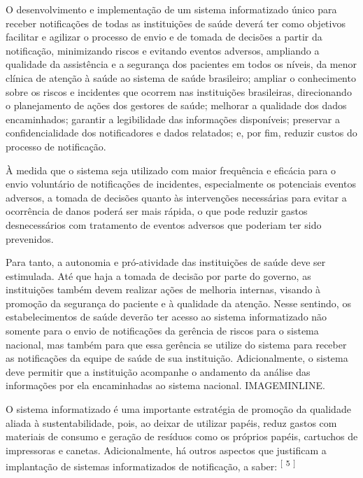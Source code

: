 \documentclass{article}
\begin{document}

O desenvolvimento e implementação de um sistema informatizado único para receber
        notificações de todas as instituições de saúde deverá ter como objetivos facilitar e
        agilizar o processo de envio e de tomada de decisões a partir da notificação, minimizando
        riscos e evitando eventos adversos, ampliando a qualidade da assistência e a segurança dos
        pacientes em todos os níveis, da menor clínica de atenção à saúde ao sistema de saúde
        brasileiro; ampliar o conhecimento sobre os riscos e incidentes que ocorrem nas instituições
        brasileiras, direcionando o planejamento de ações dos gestores de saúde; melhorar a
        qualidade dos dados encaminhados; garantir a legibilidade das informações disponíveis;
        preservar a confidencialidade dos notificadores e dados relatados; e, por fim, reduzir
        custos do processo de notificação.

À medida que o sistema seja utilizado com maior frequência e eficácia para o envio
        voluntário de notificações de incidentes, especialmente os potenciais eventos adversos, a
        tomada de decisões quanto às intervenções necessárias para evitar a ocorrência de danos
        poderá ser mais rápida, o que pode reduzir gastos desnecessários com tratamento de eventos
        adversos que poderiam ter sido prevenidos.

Para tanto, a autonomia e pró-atividade das instituições de saúde deve ser estimulada. Até
        que haja a tomada de decisão por parte do governo, as instituições também devem realizar
        ações de melhoria internas, visando à promoção da segurança do paciente e à qualidade da
        atenção. Nesse sentindo, os estabelecimentos de saúde deverão ter acesso ao sistema
        informatizado não somente para o envio de notificações da gerência de riscos para o sistema
        nacional, mas também para que essa gerência se utilize do sistema para receber as
        notificações da equipe de saúde de sua instituição. Adicionalmente, o sistema deve permitir
        que a instituição acompanhe o andamento da análise das informações por ela encaminhadas ao
        sistema nacional. IMAGEMINLINE.

O sistema informatizado é uma importante estratégia de promoção da qualidade aliada à
        sustentabilidade, pois, ao deixar de utilizar papéis, reduz gastos com materiais de consumo
        e geração de resíduos como os próprios papéis, cartuchos de impressoras e canetas.
        Adicionalmente, há outros aspectos que justificam a implantação de sistemas informatizados
        de notificação, a saber: %
\textsuperscript{[}%
\textsuperscript{5}
\textsuperscript{]}  
\end{document}
